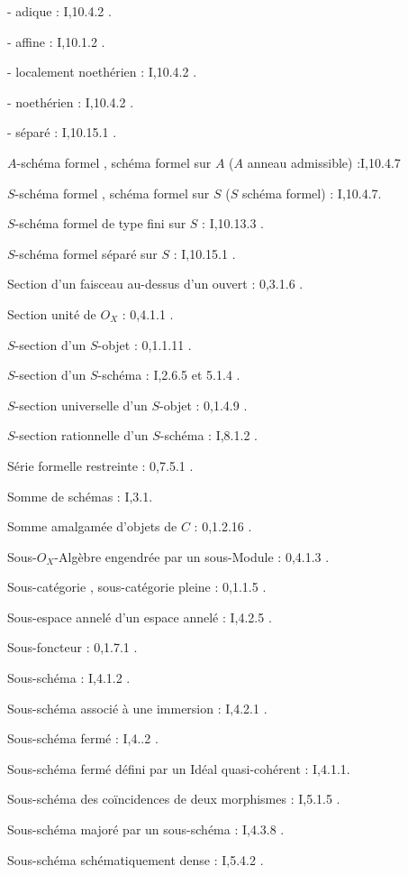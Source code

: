 - adique : I,10.4.2 .

- affine : I,10.1.2 .

- localement noethérien : I,10.4.2 .

- noethérien : I,10.4.2 .

- séparé : I,10.15.1 .

$A$-schéma formel , schéma formel sur $A$ ($A$ anneau admissible) :I,10.4.7

$S$-schéma formel , schéma formel sur $S$ ($S$ schéma formel) : I,10.4.7.

$S$-schéma formel de type fini sur $S$ : I,10.13.3 .

$S$-schéma formel séparé sur $S$ : I,10.15.1 .

Section d'un faisceau au-dessus d'un ouvert : 0,3.1.6 .

Section unité de $O_X$ : 0,4.1.1 .

$S$-section d'un $S$-objet : 0,1.1.11 .

$S$-section d'un $S$-schéma : I,2.6.5 et 5.1.4 .

$S$-section universelle d'un $S$-objet : 0,1.4.9 .

$S$-section rationnelle d'un $S$-schéma : I,8.1.2 .

Série formelle restreinte : 0,7.5.1 .

Somme de schémas :  I,3.1.

Somme amalgamée d'objets de \uline{$C$} : 0,1.2.16 .

Sous-$O_X$-Algèbre engendrée par un sous-Module : 0,4.1.3 .

Sous-catégorie , sous-catégorie  pleine : 0,1.1.5 .

Sous-espace annelé d'un espace annelé : I,4.2.5 .

 Sous-foncteur : 0,1.7.1 .

Sous-schéma : I,4.1.2 .

Sous-schéma associé à une immersion : I,4.2.1 .

Sous-schéma fermé : I,4..2 .

Sous-schéma fermé défini par un Idéal quasi-cohérent : I,4.1.1.

Sous-schéma des coïncidences de deux morphismes : I,5.1.5 .

Sous-schéma majoré par un sous-schéma : I,4.3.8 .

Sous-schéma schématiquement dense : I,5.4.2 .

